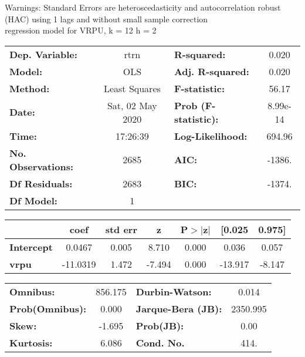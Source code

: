 Warnings: \newline
 [1] Standard Errors are heteroscedasticity and autocorrelation robust (HAC) using 1 lags and without small sample correction\\ 

regression model for VRPU, k = 12 h = 2\begin{center}
\begin{tabular}{lclc}
\toprule
\textbf{Dep. Variable:}    &       rtrn       & \textbf{  R-squared:         } &     0.020   \\
\textbf{Model:}            &       OLS        & \textbf{  Adj. R-squared:    } &     0.020   \\
\textbf{Method:}           &  Least Squares   & \textbf{  F-statistic:       } &     56.17   \\
\textbf{Date:}             & Sat, 02 May 2020 & \textbf{  Prob (F-statistic):} &  8.99e-14   \\
\textbf{Time:}             &     17:26:39     & \textbf{  Log-Likelihood:    } &    694.96   \\
\textbf{No. Observations:} &        2685      & \textbf{  AIC:               } &    -1386.   \\
\textbf{Df Residuals:}     &        2683      & \textbf{  BIC:               } &    -1374.   \\
\textbf{Df Model:}         &           1      & \textbf{                     } &             \\
\bottomrule
\end{tabular}
\begin{tabular}{lcccccc}
                   & \textbf{coef} & \textbf{std err} & \textbf{z} & \textbf{P$> |$z$|$} & \textbf{[0.025} & \textbf{0.975]}  \\
\midrule
\textbf{Intercept} &       0.0467  &        0.005     &     8.710  &         0.000        &        0.036    &        0.057     \\
\textbf{vrpu}      &     -11.0319  &        1.472     &    -7.494  &         0.000        &      -13.917    &       -8.147     \\
\bottomrule
\end{tabular}
\begin{tabular}{lclc}
\textbf{Omnibus:}       & 856.175 & \textbf{  Durbin-Watson:     } &    0.014  \\
\textbf{Prob(Omnibus):} &   0.000 & \textbf{  Jarque-Bera (JB):  } & 2350.995  \\
\textbf{Skew:}          &  -1.695 & \textbf{  Prob(JB):          } &     0.00  \\
\textbf{Kurtosis:}      &   6.086 & \textbf{  Cond. No.          } &     414.  \\
\bottomrule
\end{tabular}
\end{center}

